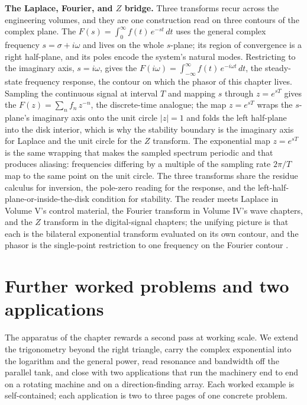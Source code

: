 \begin{mastery}
\textbf{The Laplace, Fourier, and $Z$ bridge.} Three transforms recur
across the engineering volumes, and they are one construction read on
three contours of the complex plane. The 
$F(s) = \int_{0}^{\infty} f(t)\,e^{-st}\,dt$ uses the general complex
frequency $s = \sigma + i\omega$ and lives on the whole $s$-plane; its
region of convergence is a right half-plane, and its poles encode the
system's natural modes. Restricting to the imaginary axis, $s = i\omega$,
gives the  $F(i\omega) = \int_{-\infty}^{\infty}
f(t)\,e^{-i\omega t}\,dt$, the steady-state frequency response, the
contour on which the phasor of this chapter lives. Sampling the
continuous signal at interval $T$ and mapping $s$ through $z = e^{sT}$
gives the  $F(z) = \sum_{n} f_{n}\,z^{-n}$, the
discrete-time analogue; the map $z = e^{sT}$ wraps the $s$-plane's
imaginary axis onto the unit circle $|z| = 1$ and folds the left
half-plane into the disk interior, which is why the stability boundary is
the imaginary axis for Laplace and the unit circle for the $Z$ transform.
The exponential map $z = e^{sT}$ is the same wrapping that makes the
sampled spectrum periodic and that produces aliasing: frequencies
differing by a multiple of the sampling rate $2\pi/T$ map to the same
point on the unit circle. The three transforms share the residue calculus
for inversion, the pole-zero reading for the response, and the
left-half-plane-or-inside-the-disk condition for stability. The reader
meets Laplace in Volume V's control material, the Fourier transform in
Volume IV's wave chapters, and the $Z$ transform in the digital-signal
chapters; the unifying picture is that each is the bilateral exponential
transform evaluated on its own contour, and the phasor is the single-point
restriction to one frequency on the Fourier contour
\cite[chapter 9]{text:oppenheim-schafer}.
\end{mastery}

\section{Further worked problems and two applications}

The apparatus of the chapter rewards a second pass at working scale. We
extend the trigonometry beyond the right triangle, carry the complex
exponential into the logarithm and the general power, read resonance and
bandwidth off the parallel tank, and close with two applications that run
the machinery end to end on a rotating machine and on a direction-finding
array. Each worked example is self-contained; each application is two to
three pages of one concrete problem.

